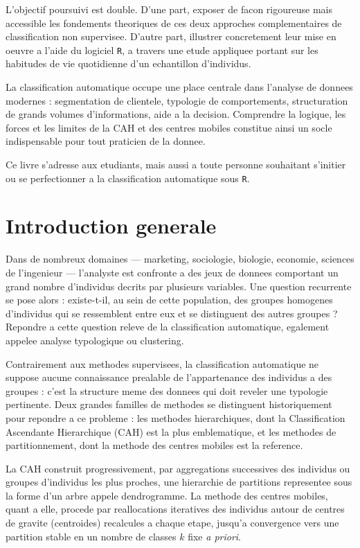 \documentclass[12pt,a4paper]{book}
\newcommand{\R}{\texttt{R}}
\begin{document}
	L'objectif poursuivi est double. D'une part, exposer de facon rigoureuse mais accessible les fondements theoriques de ces deux approches complementaires de classification non supervisee. D'autre part, illustrer concretement leur mise en oeuvre a l'aide du logiciel \R, a travers une etude appliquee portant sur les habitudes de vie quotidienne d'un echantillon d'individus.
	
	La classification automatique occupe une place centrale dans l'analyse de donnees modernes : segmentation de clientele, typologie de comportements, structuration de grands volumes d'informations, aide a la decision. Comprendre la logique, les forces et les limites de la CAH et des centres mobiles constitue ainsi un socle indispensable pour tout praticien de la donnee.
	
	Ce livre s'adresse aux etudiants, mais aussi a toute personne souhaitant s'initier ou se perfectionner a la classification automatique sous \R.
	
	\newpage
	
	\chapter*{Introduction generale}
	
	Dans de nombreux domaines — marketing, sociologie, biologie, economie, sciences de l'ingenieur — l'analyste est confronte a des jeux de donnees comportant un grand nombre d'individus decrits par plusieurs variables. Une question recurrente se pose alors : existe-t-il, au sein de cette population, des groupes homogenes d'individus qui se ressemblent entre eux et se distinguent des autres groupes ? Repondre a cette question releve de la classification automatique, egalement appelee analyse typologique ou clustering.
	
	Contrairement aux methodes supervisees, la classification automatique ne suppose aucune connaissance prealable de l'appartenance des individus a des groupes : c'est la structure meme des donnees qui doit reveler une typologie pertinente. Deux grandes familles de methodes se distinguent historiquement pour repondre a ce probleme : les methodes hierarchiques, dont la Classification Ascendante Hierarchique (CAH) est la plus emblematique, et les methodes de partitionnement, dont la methode des centres mobiles est la reference.
	
	La CAH construit progressivement, par aggregations successives des individus ou groupes d'individus les plus proches, une hierarchie de partitions representee sous la forme d'un arbre appele dendrogramme. La methode des centres mobiles, quant a elle, procede par reallocations iteratives des individus autour de centres de gravite (centroides) recalcules a chaque etape, jusqu'a convergence vers une partition stable en un nombre de classes $k$ fixe \textit{a priori}.
	
\end{document}

